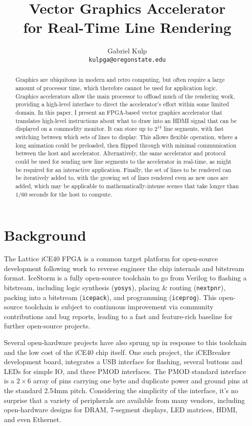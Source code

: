 \documentclass[11pt,conference]{IEEEtran}
\title{Vector Graphics Accelerator\\for Real-Time Line Rendering}
\author{Gabriel Kulp\\\texttt{kulpga@oregonstate.edu}}
\begin{document}
\maketitle
\begin{abstract}
	Graphics are ubiquitous in modern and retro computing, but often require a large amount of processor time, which therefore cannot be used for application logic.
	Graphics accelerators allow the main processor to offload much of the rendering work, providing a high-level interface to direct the accelerator's effort within some limited domain.
	In this paper, I present an FPGA-based vector graphics accelerator that translates high-level instructions about what to draw into an HDMI signal that can be displayed on a commodity monitor.
	It can store up to $2^{14}$ line segments, with fast switching between which sets of lines to display. This allows flexible operation, where a long animation could be preloaded, then flipped through with minimal communication between the host and accelerator.
	Alternatively, the same accelerator and protocol could be used for sending new line segments to the accelerator in real-time, as might be required for an interactive application.
	Finally, the set of lines to be rendered can be iteratively added to, with the growing set of lines rendered even as new ones are added, which may be applicable to mathematically-intense scenes that take longer than $1/60$ seconds for the host to compute.
\end{abstract}

\section{Background}
The Lattice iCE40 FPGA\cite{LatticePage} is a common target platform for open-source development following work to reverse engineer the chip internals and bitstream format.
IceStorm\cite{IceStorm} is a fully open-source toolchain to go from Verilog to flashing a bitstream, including logic synthesis (\texttt{yosys}), placing \& routing (\texttt{nextpnr}), packing into a bitstream (\texttt{icepack}), and programming (\texttt{iceprog}).
This open-source toolchain is subject to continuous improvement via community contributions and bug reports, leading to a fast and feature-rich baseline for further open-source projects.

Several open-hardware projects have also sprung up in response to this toolchain and the low cost of the iCE40 chip itself.
One such project, the iCEBreaker development board\cite{iCEBreaker}, integrates a USB interface for flashing, several buttons and LEDs for simple IO, and three PMOD interfaces.
The PMOD standard interface is a $2\times6$ array of pins carrying one byte and duplicate power and ground pins at the standard 2.54mm pitch.
Considering the simplicity of the interface, it's no surprise that a variety of peripherals are available from many vendors, including open-hardware designs for DRAM, 7-segment displays, LED matrices, HDMI, and even Ethernet.
\end{document}
